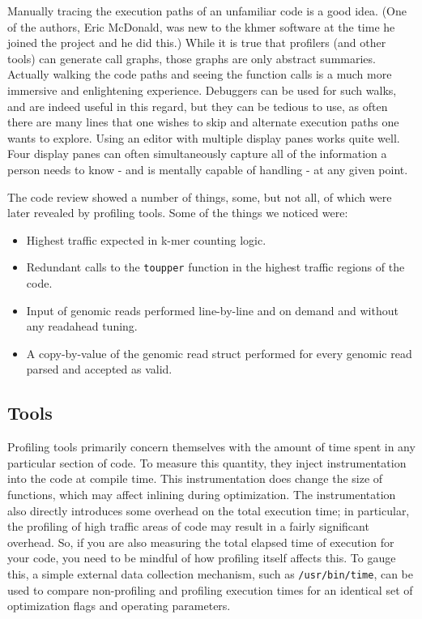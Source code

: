 \documentclass{article}
\begin{document}
Manually tracing the execution paths of an unfamiliar code is a good idea. (One of the authors, Eric McDonald, was new to the khmer software at the time he joined the project and he did this.) While it is true that profilers (and other tools) can generate call graphs, those graphs are only abstract summaries. Actually walking the code paths and seeing the function calls is a much more immersive and enlightening experience. Debuggers can be used for such walks, and are indeed useful in this regard, but they can be tedious to use, as often there are many lines that one wishes to skip and alternate execution paths one wants to explore. Using an editor with multiple display panes works quite well. Four display panes can often simultaneously capture all of the information a person needs to know - and is mentally capable of handling - at any given point.

The code review showed a number of things, some, but not all, of which were later revealed by profiling tools. Some of the things we noticed were:

\begin{itemize}
\item Highest traffic expected in k-mer counting logic.
\item Redundant calls to the \texttt{toupper} function in the highest traffic regions of the code.
\item Input of genomic reads performed line-by-line and on demand and without any readahead tuning.
\item A copy-by-value of the genomic read struct performed for every genomic read parsed and accepted as valid.
\end{itemize}

\subsection{Tools}

Profiling tools primarily concern themselves with the amount of time spent in any particular section of code. To measure this quantity, they inject instrumentation into the code at compile time. This instrumentation does change the size of functions, which may affect inlining during optimization. The instrumentation also directly introduces some overhead on the total execution time; in particular, the profiling of high traffic areas of code may result in a fairly significant overhead. So, if you are also measuring the total elapsed time of execution for your code, you need to be mindful of how profiling itself affects this. To gauge this, a simple external data collection mechanism, such as \texttt{/usr/bin/time}, can be used to compare non-profiling and profiling execution times for an identical set of optimization flags and operating parameters.
\end{document}

